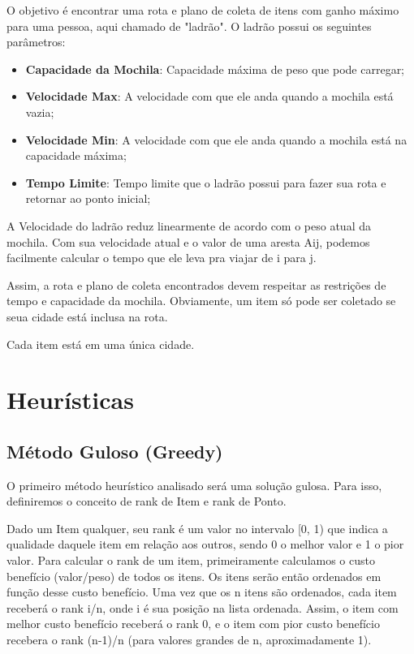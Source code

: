 \documentclass[12pt,14paper,onecolumn]{article}
\begin{document}
O objetivo é encontrar uma rota e plano de coleta de itens com ganho máximo para uma pessoa, aqui chamado de "ladrão".
O ladrão possui os seguintes parâmetros:

\begin{itemize}
\item \textbf{Capacidade da Mochila}: Capacidade máxima de peso que pode carregar;
\item \textbf{Velocidade Max}: A velocidade com que ele anda quando a mochila está vazia;
\item \textbf{Velocidade Min}: A velocidade com que ele anda quando a mochila está na capacidade máxima;
\item \textbf{Tempo Limite}: Tempo limite que o ladrão possui para fazer sua rota e retornar ao ponto inicial;
\end{itemize}

A Velocidade do ladrão reduz linearmente de acordo com o peso atual da mochila. Com sua velocidade atual e o valor de uma aresta Aij, podemos facilmente calcular o tempo que ele leva pra viajar de i para j.

Assim, a rota e plano de coleta encontrados devem respeitar as restrições de tempo e capacidade da mochila. Obviamente, um item só pode ser coletado se seua cidade está inclusa na rota.

Cada item está em uma única cidade.

\section{Heurísticas}
\subsection{Método Guloso (Greedy)}
O primeiro método heurístico analisado será uma solução gulosa. 
Para isso, definiremos o conceito de rank de Item e rank de Ponto.

Dado um Item qualquer, seu rank é um valor no intervalo [0, 1) que indica a qualidade daquele item em relação aos outros, sendo 0 o melhor valor e 1 o pior valor.
Para calcular o rank de um item, primeiramente calculamos o custo benefício (valor/peso) de todos os itens. Os itens serão então ordenados em função desse custo benefício.
Uma vez que os n itens são ordenados, cada item receberá o rank i/n, onde i é sua posição na lista ordenada.
Assim, o item com melhor custo benefício receberá o rank 0, e o item com pior custo benefício recebera o rank (n-1)/n (para valores grandes de n, aproximadamente 1).
\end{document}
